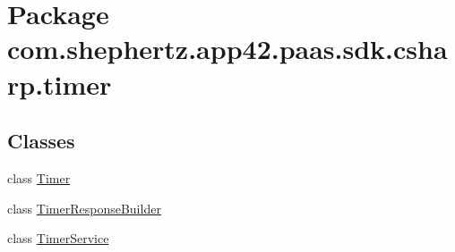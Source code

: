 \hypertarget{namespacecom_1_1shephertz_1_1app42_1_1paas_1_1sdk_1_1csharp_1_1timer}{\section{Package com.\+shephertz.\+app42.\+paas.\+sdk.\+csharp.\+timer}
\label{namespacecom_1_1shephertz_1_1app42_1_1paas_1_1sdk_1_1csharp_1_1timer}
}
\subsection*{Classes}
\begin{DoxyCompactItemize}
\item 
class \hyperlink{classcom_1_1shephertz_1_1app42_1_1paas_1_1sdk_1_1csharp_1_1timer_1_1_timer}{Timer}
\item 
class \hyperlink{classcom_1_1shephertz_1_1app42_1_1paas_1_1sdk_1_1csharp_1_1timer_1_1_timer_response_builder}{Timer\+Response\+Builder}
\item 
class \hyperlink{classcom_1_1shephertz_1_1app42_1_1paas_1_1sdk_1_1csharp_1_1timer_1_1_timer_service}{Timer\+Service}
\end{DoxyCompactItemize}
